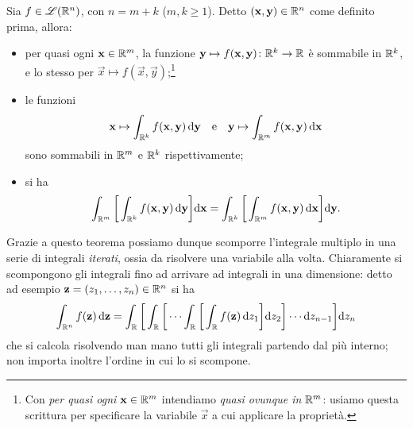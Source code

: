 \begin{teorema}[Fubini] \label{t:fubini}
	Sia $f\in\mathscr L(\mathbb{R}^n)$, con $n=m+k$ ($m,k\geq 1$).
	Detto $(\mathbf{x},\mathbf{y})\in\mathbb{R}^n$ come definito prima, allora:
	\begin{itemize}
		\item per quasi ogni $\mathbf{x}\in\mathbb{R}^m$, la funzione $\mathbf{y}\mapsto f(\mathbf{x},\mathbf{y})\colon\mathbb{R}^k\to\mathbb{R}$ è sommabile in $\mathbb{R}^k$, e lo stesso per $\vec x\mapsto f(\vec x,\vec y)$;\footnote{Con \emph{per quasi ogni $\mathbf{x}\in\mathbb{R}^m$} intendiamo \emph{quasi ovunque in $\mathbb{R}^m$}: usiamo questa scrittura per specificare la variabile $\vec x$ a cui applicare la proprietà.}
		\item le funzioni
			\begin{equation*}
				\mathbf{x}\mapsto\int_{\mathbb{R}^k}f(\mathbf{x},\mathbf{y})\,\textup{d}\mathbf{y}\quad\text{e}\quad\mathbf{y}\mapsto\int_{\mathbb{R}^m}f(\mathbf{x},\mathbf{y})\,\textup{d}\mathbf{x}
			\end{equation*}
			sono sommabili in $\mathbb{R}^m$ e $\mathbb{R}^k$ rispettivamente;
		\item si ha
			\begin{equation*}
				\int_{\mathbb{R}^m}\bigg[\int_{\mathbb{R}^k}f(\mathbf{x},\mathbf{y})\,\textup{d}\mathbf{y}\bigg]\textup{d}\mathbf{x}=\int_{\mathbb{R}^k}\bigg[\int_{\mathbb{R}^m}f(\mathbf{x},\mathbf{y})\,\textup{d}\mathbf{x}\bigg]\textup{d}\mathbf{y}.
			\end{equation*}
	\end{itemize}
\end{teorema}
Grazie a questo teorema possiamo dunque scomporre l'integrale multiplo in una serie di integrali \emph{iterati}, ossia da risolvere una variabile alla volta.
Chiaramente si scompongono gli integrali fino ad arrivare ad integrali in una dimensione: detto ad esempio $\mathbf{z}=(z_1,\dots,z_n)\in\mathbb{R}^n$ si ha
\begin{equation*}
	\int_{\mathbb{R}^n}f(\mathbf{z})\,\textup{d}\mathbf{z}=\int_{\mathbb{R}}\bigg[\int_{\mathbb{R}}\bigg[\cdots\int_{\mathbb{R}}\bigg[\int_{\mathbb{R}} f(\mathbf{z})\,\textup{d} z_1\bigg]\textup{d} z_2\bigg]\cdots\textup{d} z_{n-1}\bigg]\textup{d} z_n
\end{equation*}
che si calcola risolvendo man mano tutti gli integrali partendo dal più interno; non importa inoltre l'ordine in cui lo si scompone.

